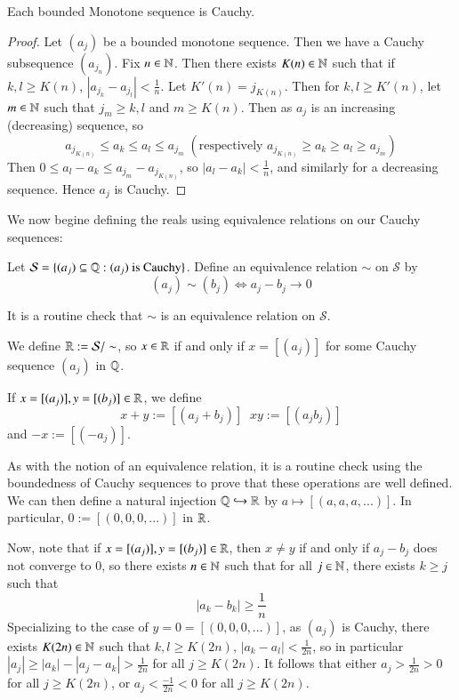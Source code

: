 \begin{cor}
    Each bounded Monotone sequence is Cauchy.
\end{cor}
\begin{proof}
    Let $(a_j)$ be a bounded monotone sequence. Then we have a Cauchy subsequence $(a_{j_n})$. Fix $n \in \mathbb N$. Then there exists $K(n) \in \mathbb N$ such that if $k,l \geq K(n)$, $|a_{j_k} - a_{j_l}| < \frac{1}{n}$. Let $K'(n) = j_{K(n)}$. Then for $k,l \geq K'(n)$, let $m \in \mathbb N$ such that $j_m \geq k,l$ and $m \geq K(n)$. Then as $a_j$ is an increasing (decreasing) sequence, so $$a_{j_{K(n)}} \leq a_k \leq a_l \leq a_{j_m}\;(\text{respectively }a_{j_{K(n)}} \geq a_k \geq a_l \geq a_{j_m})$$ Then $0 \leq a_l - a_k \leq a_{j_m} - a_{j_{K(n)}}$, so $|a_l - a_k| < \frac{1}{n}$, and similarly for a decreasing sequence. Hence $a_j$ is Cauchy.
\end{proof}

We now begine defining the reals using equivalence relations on our Cauchy sequences:

\begin{defn}
    Let $\mathcal{S} = \{(a_j) \subseteq \mathbb Q:(a_j) \text{ is Cauchy}\}$. Define an equivalence relation $\sim$ on $\mathcal{S}$ by $$(a_j)\sim (b_j) \iff a_j-b_j\rightarrow 0$$
\end{defn}

It is a routine check that $\sim$ is an equivalence relation on $\mathcal{S}$. 

\begin{defn}
    We define $\mathbb R := \mathcal{S}/\sim$, so $x \in \mathbb R$ if and only if $x = [(a_j)]$ for some Cauchy sequence $(a_j)$ in $\mathbb Q$.
\end{defn}

\begin{defn}
    If $x = [(a_j)], y = [(b_j)] \in \mathbb R$, we define $$x+y := [(a_j+b_j)]\;\;xy := [(a_jb_j)]$$ and $-x := [(-a_j)]$.
\end{defn}

As with the notion of an equivalence relation, it is a routine check using the boundedness of Cauchy sequences to prove that these operations are well defined. We can then define a natural injection $\mathbb Q\hookrightarrow \mathbb R$ by $a\mapsto [(a,a,a,...)]$. In particular, $0:= [(0,0,0,...)]$ in $\mathbb R$. 

Now, note that if $x = [(a_j)], y = [(b_j)] \in \mathbb R$, then $x \neq y$ if and only if $a_j-b_j$ does not converge to $0$, so there exists $n \in \mathbb N$ such that for all $j \in \mathbb N$, there exists $k \geq j$ such that $$|a_k - b_k| \geq \frac{1}{n}$$ Specializing to the case of $y = 0=[(0,0,0,...)]$, as $(a_j)$ is Cauchy, there exists $K(2n) \in \mathbb N$ such that $k,l \geq K(2n)$, $|a_k - a_l| < \frac{1}{2n}$, so in particular $|a_j| \geq |a_k| - |a_j - a_k| > \frac{1}{2n}$ for all $j \geq K(2n)$. It follows that either $a_j > \frac{1}{2n} > 0$ for all $j \geq K(2n)$, or $a_j < \frac{-1}{2n} < 0$ for all $j \geq K(2n)$.


